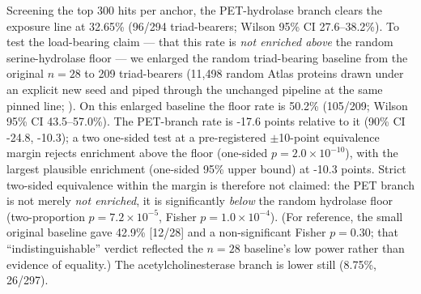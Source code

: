 
Screening the top 300 hits per anchor, the PET-hydrolase branch clears the exposure
line at 32.65\% (96/294 triad-bearers; Wilson 95\% CI 27.6--38.2\%). To test the
load-bearing claim --- that this rate is \emph{not enriched above} the random
serine-hydrolase floor --- we enlarged the random triad-bearing baseline from the
original $n=28$ to 209 triad-bearers (11,498 random Atlas
proteins drawn under an explicit new seed and piped through the unchanged pipeline at
the same pinned line; ). On this enlarged baseline the floor
rate is 50.2\% (105/209; Wilson 95\% CI
43.5--57.0\%). The PET-branch rate is
-17.6 points relative to it (90\% CI -24.8, -10.3); a two
one-sided test at a pre-registered $\pm$10-point equivalence margin
rejects enrichment above the floor (one-sided $p=2.0\times10^{-10}$), with the largest
plausible enrichment (one-sided 95\% upper bound) at -10.3 points.
Strict two-sided equivalence within the margin is therefore not claimed: the PET branch is not merely \emph{not enriched}, it is significantly \emph{below} the random hydrolase floor (two-proportion $p=7.2\times10^{-5}$, Fisher $p=1.0\times10^{-4}$). (For reference, the small original baseline gave 42.9\% [12/28] and
a non-significant Fisher $p=0.30$; that ``indistinguishable'' verdict reflected the
$n=28$ baseline's low power rather than evidence of equality.) The
acetylcholinesterase branch is lower still (8.75\%, 26/297).


